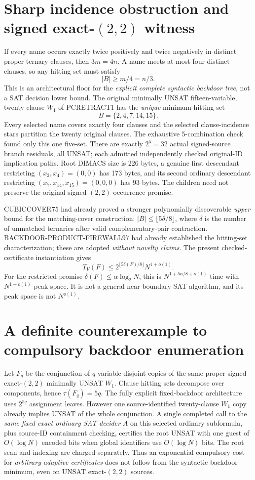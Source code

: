 \documentclass[11pt]{article}
\begin{document}
\section{Sharp incidence obstruction and signed exact-$(2,2)$ witness}
If every name occurs exactly twice positively and twice negatively in distinct proper ternary clauses, then $3m=4n$. A name meets at most four distinct clauses, so any hitting set must satisfy
\[
|B|\ge m/4=n/3.
\]
This is an architectural floor for the \emph{explicit complete syntactic backdoor tree}, not a SAT decision lower bound. The original minimally UNSAT fifteen-variable, twenty-clause $W_1$ of PCRETRACT1 has the \emph{unique} minimum hitting set
\[
B=\{2,4,7,14,15\}.
\]
Every selected name covers exactly four clauses and the selected clause-incidence stars partition the twenty original clauses. The exhaustive 5-combination check found only this one five-set. There are exactly $2^5=32$ actual signed-source branch residuals, all UNSAT; each admitted independently checked original-ID implication paths. Root DIMACS size is 226 bytes, a genuine first descendant restricting $(x_2,x_4)=(0,0)$ has 173 bytes, and its second ordinary descendant restricting $(x_7,x_{14},x_{15})=(0,0,0)$ has 93 bytes. The children need not preserve the original signed-$(2,2)$ occurrence promise.

CUBICCOVER75 had already proved a stronger polynomially discoverable \emph{upper} bound for the matching-cover construction: $|B|\le\lfloor5\delta/8\rfloor$, where $\delta$ is the number of unmatched ternaries after valid complementary-pair contraction. BACKDOOR-PRODUCT-FIREWALL97 had already established the hitting-set characterization; these are adopted \emph{without novelty claims}. The present checked-certificate instantiation gives
\[
T_V(F)\le 2^{\lfloor5\delta(F)/8\rfloor}N^{1+o(1)}.
\]
For the restricted promise $\delta(F)\le\alpha\log_2N$, this is $N^{1+5\alpha/8+o(1)}$ time with $N^{1+o(1)}$ peak space. It is not a general near-boundary SAT algorithm, and its peak space is not $N^{o(1)}$.
\section{A definite counterexample to compulsory backdoor enumeration}
Let $F_q$ be the conjunction of $q$ variable-disjoint copies of the same proper signed exact-$(2,2)$ minimally UNSAT $W_1$. Clause hitting sets decompose over components, hence $\tau(F_q)=5q$. The fully explicit fixed-backdoor architecture uses $2^{5q}$ assignment leaves. However one source-identified twenty-clause $W_1$ copy already implies UNSAT of the whole conjunction. A single completed call to the \emph{same fixed exact ordinary SAT decider} $A$ on this selected ordinary subformula, plus source-ID containment checking, certifies the root UNSAT with one guest of $O(\log N)$ encoded bits when global identifiers use $O(\log N)$ bits. The root scan and indexing are charged separately. Thus an exponential compulsory cost for \emph{arbitrary adaptive certificates} does not follow from the syntactic backdoor minimum, even on UNSAT exact-$(2,2)$ sources.
\end{document}
